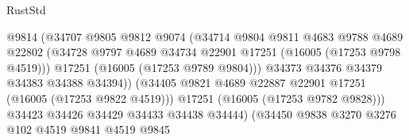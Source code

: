 \begin{lexlean}{RustStd}
\begin{coremodule}
                                          @9814
                                          (@34707
                                            @9805
                                            @9812
                                            @9074
                                            (@34714
                                              @9804
                                              @9811
                                              @4683
                                              @9788
                                              @4689
                                              @22802
                                              (@34728
                                                @9797
                                                @4689
                                                @34734
                                                @22901
                                                @17251
                                                (@16005 (@17253 @9798 @4519)))
                                              @17251
                                              (@16005 (@17253 @9789 @9804)))
                                            @34373
                                            @34376
                                            @34379
                                            @34383
                                            @34388
                                            @34394))
                                        (@34405
                                          @9821
                                          @4689
                                          @22887
                                          @22901
                                          @17251
                                          (@16005 (@17253 @9822 @4519)))
                                        @17251
                                        (@16005 (@17253 @9782 @9828)))
                                      @34423
                                      @34426
                                      @34429
                                      @34433
                                      @34438
                                      @34444)
                                    (@34450
                                      @9838
                                      @3270
                                      @3276
                                      @102
                                      @4519
                                      @9841
                                      @4519
                                      @9845

\end{coremodule}
\end{lexlean}
